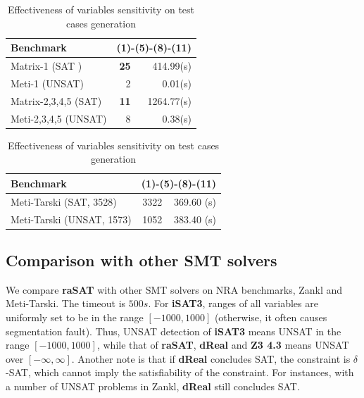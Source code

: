 \documentclass[runningheads,a4paper,oribibl]{llncs}
\begin{document}
\begin{table}
\begin{tabular}{ | l | r | r |}
\hline
    \multicolumn{1}{|l|}{Benchmark} & 
    \multicolumn{2}{c|}{(1)-(5)-(8)-(11)} \\
\hline
    Matrix-1 (SAT ) & \textbf{25} & 414.99(s)
\\
\hline
    Meti-1 (UNSAT) & 2 & 0.01(s)
\\
\hline
	Matrix-2,3,4,5 (SAT) & \textbf{11} & 1264.77(s)
\\
\hline
    Meti-2,3,4,5 (UNSAT) & 8 & 0.38(s)
\\
\hline
\end{tabular}
\begin{tabular}{ | l | r | r |}
\hline
    \multicolumn{1}{|l|}{Benchmark} & 
    \multicolumn{2}{c|}{(1)-(5)-(8)-(11)} \\
\hline
    Meti-Tarski (SAT, 3528) & 3322 & 369.60 (s)
\\
\hline
    Meti-Tarski (UNSAT, 1573) & 1052 & 383.40 (s)
\\
\hline
\end{tabular}
\caption{Effectiveness of variables sensitivity on test cases generation} 
\label{tab:test-sen}
\end{table}

\subsection{Comparison with other SMT solvers}

We compare {\bf raSAT} with other SMT solvers on NRA benchmarks, Zankl and Meti-Tarski. 
The timeout is $500s$. 
For {\bf iSAT3}, ranges of all variables are uniformly set to be in the range $[-1000, 1000]$
(otherwise, it often causes segmentation fault). 
Thus, UNSAT detection of {\bf iSAT3} means UNSAT in the range $[-1000, 1000]$, 
while that of {\bf raSAT}, \textbf{dReal} and {\bf Z3 4.3} means  UNSAT over $[-\infty, \infty]$. Another note is that if \textbf{dReal} concludes SAT, the constraint is $\delta$-SAT, which cannot imply the satisfiability of the constraint. For instances, with a number of UNSAT problems in Zankl, \textbf{dReal} still concludes SAT.
\end{document}
